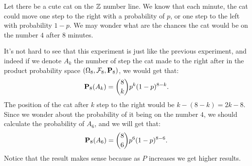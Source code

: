 \documentclass[11pt,a4paper]{article}
\begin{document}
  \begin{example}
    Let there be a cute cat on the $\mathbb{Z}$ number line. 
    We know that each minute, the cat could move one step to the right with
    a probability of $p$, or one step to the left with probability $1-p$.
    We may wonder what are the chances the cat would be on the number $4$
    after $8$ minutes.

    It's not hard to see that this experiment is just like the previous
    experiment, and indeed if we denote $A_k$ the number of step the cat
    made to the right after in the product probability space 
    $(\Omega_8, \mathcal F_8, \mathbf{P}_8)$, we would get that:
    \[
      \mathbf{P}_8(A_k) = \binom{8}{k} p^k (1-p)^{8-k}.
    \]
    The position of the cat after $k$ step to the right would be 
    $k - (8 - k) = 2k - 8$. 
    Since we wonder about the probability of it being on the number $4$,
    we should calculate the probability of $A_6$, and we will get that:
    \[
      \mathbf{P}_{8}(A_{6}) = {\binom{8}{6}} p^{6} (1-p)^{8-6}.
    \]
    Notice that the result makes sense because as $P$ increases we get higher
    results.
  \end{example}
\end{document}
